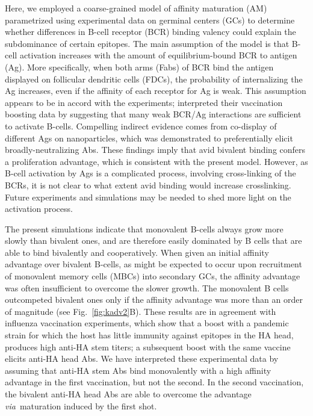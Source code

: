 \documentclass[utf8]{frontiersHLTH}%
\newcommand{\comment}[1]{} %
\def\via {{\it via}}
\newcommand{\fig}[1]{Fig.~\ref{fig:#1}}
\begin{document}
Here, we employed a coarse-grained model of affinity maturation (AM)
parametrized using experimental data on germinal centers
(GCs)\cite{wittenbrink11,weisel16,pelissier20} to determine whether
differences in B-cell receptor (BCR) binding valency could explain the
subdominance of certain epitopes. The main assumption of the model is
that B-cell activation increases with the amount of equilibrium-bound BCR
to antigen (Ag). More specifically, when both arms (Fabs) of BCR bind the antigen
displayed on follicular dendritic cells (FDCs), the probability of
internalizing the Ag increases, even if the affinity of each
receptor for Ag is weak. This assumption appears to be in accord with the
experiments;
\citet{arevalo20} interpreted their vaccination boosting data by
suggesting that many weak BCR/Ag interactions are sufficient to activate
B-cells. Compelling indirect evidence comes from co-display of
different Ags on nanoparticles, which was \comment{referring to co-display, which is singular} demonstrated to preferentially
elicit broadly-neutralizing Abs.  These findings\cite{kanekiyo19,cohen21}
imply that avid bivalent binding confers a proliferation advantage,
which is consistent with the present model. However, as B-cell activation by
Ags is
a complicated process, involving cross-linking of the BCRs, it is not
clear to what extent avid binding would increase crosslinking.
Future experiments and simulations may be needed to shed more light on the activation
process.

The present simulations indicate that monovalent B-cells always
grow more slowly than bivalent ones, and are therefore easily dominated by B cells that are able to bind bivalently and
cooperatively. When given an initial affinity advantage over bivalent
B-cells, as might be expected to occur upon recruitment of monovalent memory
cells (MBCs) into secondary GCs, the affinity advantage was often
insufficient to overcome the slower growth.
The monovalent B cells outcompeted bivalent ones only if the
affinity advantage was more than an order of magnitude (see \fig{kadv2}B). These
results are in agreement with influenza vaccination experiments, which show
that a boost with a pandemic strain for which the host has little
immunity against epitopes in the HA head, produces high anti-HA stem
titers; a subsequent boost with the same vaccine elicits anti-HA head
Abs.\cite{ellebedy14} We have interpreted these experimental data by assuming 
that anti-HA stem Abs bind monovalently with
a high affinity advantage in the first vaccination, but not the second.
In the second vaccination, the bivalent anti-HA head 
Abs are able to overcome the advantage \via~maturation induced by the first shot.
\end{document}

